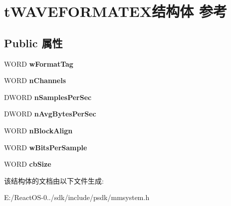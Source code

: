 \hypertarget{structt_w_a_v_e_f_o_r_m_a_t_e_x}{}\section{t\+W\+A\+V\+E\+F\+O\+R\+M\+A\+T\+E\+X结构体 参考}
\label{structt_w_a_v_e_f_o_r_m_a_t_e_x}
\subsection*{Public 属性}
\begin{DoxyCompactItemize}
\item 
\mbox{\label{structt_w_a_v_e_f_o_r_m_a_t_e_x_aec624a88d0d94d7789c60dcc1418d6fc}} 
W\+O\+RD {\bfseries w\+Format\+Tag}
\item 
\mbox{\label{structt_w_a_v_e_f_o_r_m_a_t_e_x_ae71090e815279542a4f2ffea72ff1a07}} 
W\+O\+RD {\bfseries n\+Channels}
\item 
\mbox{\label{structt_w_a_v_e_f_o_r_m_a_t_e_x_ad3a2f0a0aed0d8b3a5f6afad5f8b6acc}} 
D\+W\+O\+RD {\bfseries n\+Samples\+Per\+Sec}
\item 
\mbox{\label{structt_w_a_v_e_f_o_r_m_a_t_e_x_a933a772d450a8a8939fc96d1eb15c672}} 
D\+W\+O\+RD {\bfseries n\+Avg\+Bytes\+Per\+Sec}
\item 
\mbox{\label{structt_w_a_v_e_f_o_r_m_a_t_e_x_abb977590324e3d1b5a14f94b806b8ec1}} 
W\+O\+RD {\bfseries n\+Block\+Align}
\item 
\mbox{\label{structt_w_a_v_e_f_o_r_m_a_t_e_x_a888d33f1b1415c903bfa95ebedc78516}} 
W\+O\+RD {\bfseries w\+Bits\+Per\+Sample}
\item 
\mbox{\label{structt_w_a_v_e_f_o_r_m_a_t_e_x_a179487978b7d541067d6200524ceff2c}} 
W\+O\+RD {\bfseries cb\+Size}
\end{DoxyCompactItemize}


该结构体的文档由以下文件生成\+:\begin{DoxyCompactItemize}
\item 
E\+:/\+React\+O\+S-\/0../sdk/include/psdk/mmsystem.\+h\end{DoxyCompactItemize}
